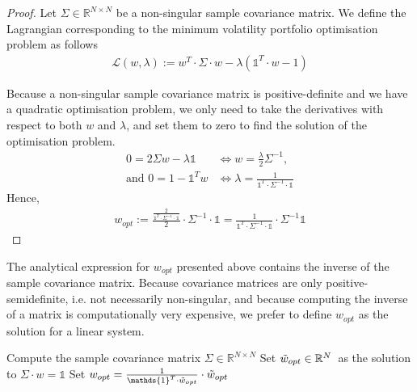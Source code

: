    \begin{proof}
        Let $\Sigma \in \mathbb{R}^{N \times N}$ be a non-singular sample covariance matrix. We define the Lagrangian corresponding to the minimum volatility portfolio optimisation problem as follows
        \begin{align*}
            \mathcal{L}(w, \lambda) := w^T \cdot \Sigma \cdot w - \lambda (\mathds{1}^T \cdot w - 1)
        \end{align*}
        
        Because a non-singular sample covariance matrix is positive-definite and we have a quadratic optimisation problem, we only need to take the derivatives with respect to both $w$ and $\lambda$, and set them to zero to find the solution of the optimisation problem.
        \begin{align*}
            0 = 2 \Sigma w - \lambda \mathds{1} &\Leftrightarrow w = \frac{\lambda}{2} \Sigma^{-1}, \\
            \text{and } 0 = 1 - \mathds{1}^T w &\Leftrightarrow \lambda = \frac{1}{\mathds{1}^T \cdot \Sigma^{-1} \cdot \mathds{1}}
        \end{align*}
        Hence,
        \begin{align*}
            w_{opt} := \frac{\frac{2}{\mathds{1}^T \cdot \Sigma^{-1} \cdot \mathds{1}}}{2} \cdot \Sigma^{-1} \cdot \mathds{1} = \frac{1}{\mathds{1}^T \cdot \Sigma^{-1} \cdot \mathds{1}} \cdot \Sigma^{-1} \mathds{1}
        \end{align*}
    \end{proof}
    
    The analytical expression for $w_{opt}$ presented above contains the inverse of the sample covariance matrix. Because covariance matrices are only positive-semidefinite, i.e. not necessarily non-singular, and because computing the inverse of a matrix is computationally very expensive, we prefer to define $w_{opt}$ as the solution for a linear system.
    
    \begin{algorithm}[H]\label{algorithm:MMVP}
        \SetAlgoLined
        Compute the sample covariance matrix $\Sigma \in \mathbb{R}^{N \times N}$\;
        Set $\Tilde{w}_{opt} \in \mathbb{R}^N$\ as the solution to $\Sigma \cdot w = \mathds{1}$\;
        Set $w_{opt} = \frac{1}{\mathds{1}^T \cdot \Tilde{w}_{opt}} \cdot \Tilde{w}_{opt}$\;
        \caption{Markowitz Minimum Variance Portfolio Computation}
    \end{algorithm}
    ~\
    
